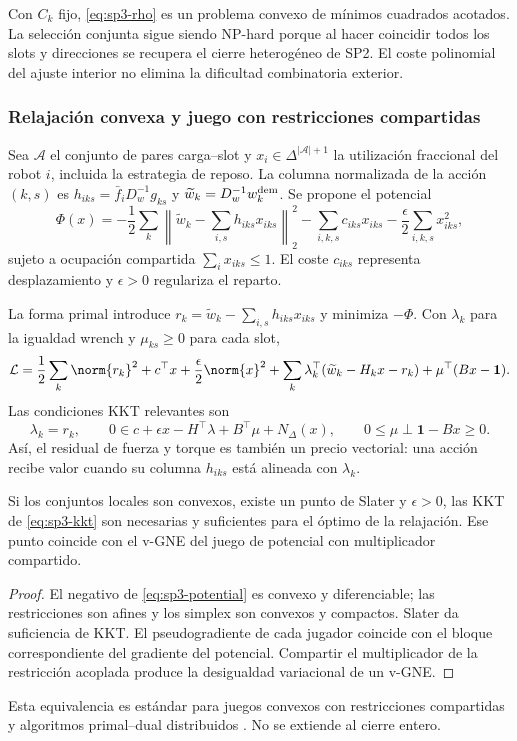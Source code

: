 Con $C_k$ fijo, \eqref{eq:sp3-rho} es un problema convexo de mínimos cuadrados
acotados. La selección conjunta sigue siendo NP-hard porque al hacer coincidir todos
los slots y direcciones se recupera el cierre heterogéneo de SP2. El coste polinomial
del ajuste interior no elimina la dificultad combinatoria exterior.

\subsubsection{Relajación convexa y juego con restricciones compartidas}

Sea $\mathcal A$ el conjunto de pares carga--slot y
$x_i\in\Delta^{|\mathcal A|+1}$ la utilización fraccional del robot $i$, incluida la
estrategia de reposo. La columna normalizada de la acción $(k,s)$ es
$h_{iks}=\bar f_iD_w^{-1}g_{ks}$ y
$\widetilde w_k=D_w^{-1}w_k^{\rm dem}$. Se propone el potencial
\[
 \Phi(x)=
 -\frac12\sum_k
 \left\|\widetilde w_k-\sum_{i,s}h_{iks}x_{iks}\right\|_2^2
 -\sum_{i,k,s}c_{iks}x_{iks}
 -\frac{\epsilon}{2}\sum_{i,k,s}x_{iks}^2 ,
 \label{eq:sp3-potential}
\]
sujeto a ocupación compartida
$\sum_i x_{iks}\leq1$. El coste $c_{iks}$ representa desplazamiento y
$\epsilon>0$ regulariza el reparto.

La forma primal introduce
$r_k=\widetilde w_k-\sum_{i,s}h_{iks}x_{iks}$ y minimiza $-\Phi$. Con
$\lambda_k$ para la igualdad wrench y $\mu_{ks}\geq0$ para cada slot,
\[
 \mathcal L=
 \frac12\sum_k\norm{r_k}^2+c^\top x+\frac{\epsilon}{2}\norm{x}^2
 +\sum_k\lambda_k^\top(\widetilde w_k-H_kx-r_k)
 +\mu^\top(Bx-\mathbf1).
\]
Las condiciones KKT relevantes son
\[
 \lambda_k=r_k,\qquad
 0\in c+\epsilon x-H^\top\lambda+B^\top\mu+N_{\Delta}(x),
 \qquad
 0\leq\mu\perp\mathbf1-Bx\geq0 .
 \label{eq:sp3-kkt}
\]
Así, el residual de fuerza y torque es también un precio vectorial: una acción recibe
valor cuando su columna $h_{iks}$ está alineada con $\lambda_k$.

\begin{proposicion}
Si los conjuntos locales son convexos, existe un punto de Slater y $\epsilon>0$, las
KKT de \eqref{eq:sp3-kkt} son necesarias y suficientes para el óptimo de la relajación.
Ese punto coincide con el v-GNE del juego de potencial con multiplicador compartido.
\end{proposicion}
\begin{proof}
El negativo de \eqref{eq:sp3-potential} es convexo y diferenciable; las restricciones
son afines y los simplex son convexos y compactos. Slater da suficiencia de KKT. El
pseudogradiente de cada jugador coincide con el bloque correspondiente del gradiente
del potencial. Compartir el multiplicador de la restricción acoplada produce la
desigualdad variacional de un v-GNE.
\end{proof}
Esta equivalencia es estándar para juegos convexos con restricciones compartidas y
algoritmos primal--dual distribuidos \citep{yi2019operator,cherukuri2016primaldual}.
No se extiende al cierre entero.

